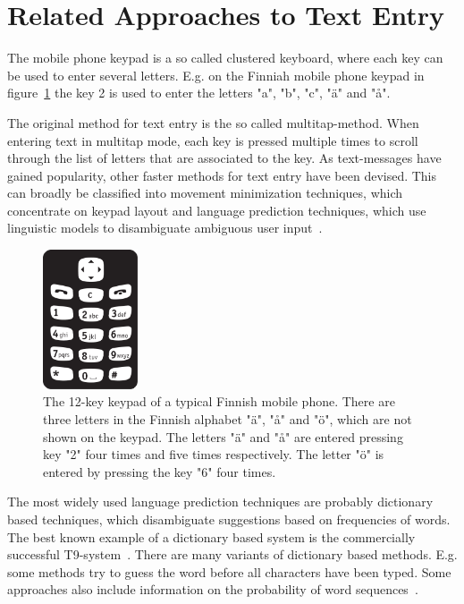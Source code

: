 \documentclass{llncs}
\begin{document}
\section{Related Approaches to Text Entry}\label{earlier-work}

The mobile phone keypad is a so called clustered keyboard, where each
key can be used to enter several letters. E.g. on the Finniah mobile
phone keypad in figure~\ref{keypad} the key 2 is used to enter the
letters "a", "b", "c", "\"{a}" and "å".

The original method for text entry is the so called
multitap-method. When entering text in multitap mode, each key is
pressed multiple times to scroll through the list of letters that are
associated to the key. As text-messages have gained popularity, other
faster methods for text entry have been devised. This can broadly be
classified into movement minimization techniques, which concentrate on
keypad layout and language prediction techniques, which use linguistic
models to disambiguate ambiguous user input~\cite{Mackenzie/HCI/2002}.

\begin{figure}[hbt!]
\begin{center}
\includegraphics[width=1.1in]{Nappaimet.pdf}
\caption{The 12-key keypad of a typical Finnish mobile phone. There
  are three letters in the Finnish alphabet "\"{a}", "å" and "\"{o}",
  which are not shown on the keypad. The letters "\"{a}" and "å" are
  entered pressing key "2" four times and five times respectively. The
  letter "\"{o}" is entered by pressing the key "6" four
  times.}\label{keypad}
\end{center}
\end{figure}


The most widely used language prediction techniques are probably
dictionary based techniques, which disambiguate suggestions based on
frequencies of words. The best known example of a dictionary based
system is the commercially successful
T9-system~\cite{t9-patent}. There are many variants of dictionary
based methods. E.g. some methods try to guess the word before all
characters have been typed. Some approaches also include information
on the probability of word sequences~\cite{Mackenzie/HCI/2002}.
\end{document}
